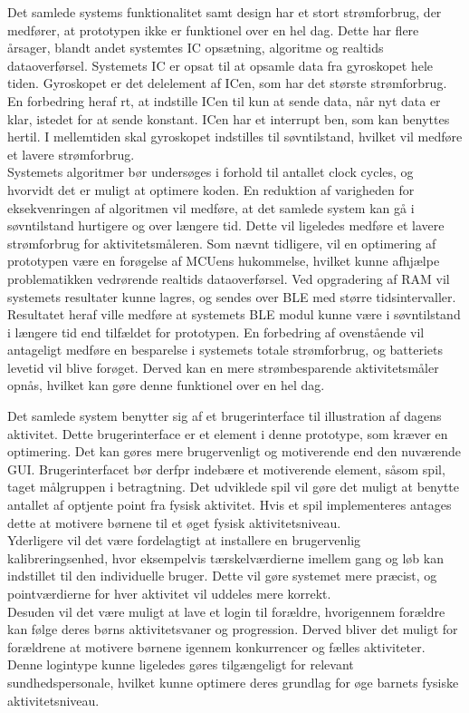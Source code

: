 Det samlede systems funktionalitet samt design har et stort strømforbrug, der medfører, at prototypen ikke er funktionel over en hel dag. Dette har flere årsager, blandt andet systemtes IC opsætning, algoritme og realtids dataoverførsel. Systemets IC er opsat til at opsamle data fra gyroskopet hele tiden. Gyroskopet er det delelement af ICen, som har det største strømforbrug. En forbedring heraf rt, at indstille ICen til kun at sende data, når nyt data er klar, istedet for at sende konstant. ICen har et interrupt ben, som kan benyttes hertil. I mellemtiden skal gyroskopet indstilles til søvntilstand, hvilket vil medføre et lavere strømforbrug. \\
Systemets algoritmer bør undersøges i forhold til antallet clock cycles, og hvorvidt det er muligt at optimere koden. En reduktion af varigheden for eksekvenringen af algoritmen vil medføre, at det samlede system kan gå i søvntilstand hurtigere og over længere tid. Dette vil ligeledes medføre et lavere strømforbrug for aktivitetsmåleren. Som nævnt tidligere, vil en optimering af prototypen være en forøgelse af MCUens hukommelse, hvilket kunne afhjælpe problematikken vedrørende realtids dataoverførsel. Ved opgradering af RAM vil systemets resultater kunne lagres, og sendes over BLE med større tidsintervaller. Resultatet heraf ville medføre at systemets BLE modul kunne være i søvntilstand i længere tid end tilfældet for prototypen. En forbedring af ovenstående vil antageligt medføre en besparelse i systemets totale strømforbrug, og batteriets levetid vil blive forøget. Derved kan en mere strømbesparende aktivitetsmåler opnås, hvilket kan gøre denne funktionel over en hel dag.

Det samlede system benytter sig af et brugerinterface til illustration af dagens aktivitet. Dette brugerinterface er et element i denne prototype, som kræver en optimering. Det kan gøres mere brugervenligt og motiverende end den nuværende GUI. Brugerinterfacet bør derfpr indebære et motiverende element, såsom spil, taget målgruppen i betragtning. Det udviklede spil vil gøre det muligt at benytte antallet af optjente point fra fysisk aktivitet. Hvis et spil implementeres antages dette at motivere børnene til et øget fysisk aktivitetsniveau. \\
Yderligere vil det være fordelagtigt at installere en brugervenlig kalibreringsenhed, hvor eksempelvis tærskelværdierne imellem gang og løb kan indstillet til den individuelle bruger. Dette vil gøre systemet mere præcist, og pointværdierne for hver aktivitet vil uddeles mere korrekt. \\
Desuden vil det være muligt at lave et login til forældre, hvorigennem forældre kan følge deres børns aktivitetsvaner og progression. Derved bliver det muligt for forældrene at motivere børnene igennem konkurrencer og fælles aktiviteter. Denne logintype kunne ligeledes gøres tilgængeligt for relevant sundhedspersonale, hvilket kunne optimere deres grundlag for øge barnets fysiske aktivitetsniveau.